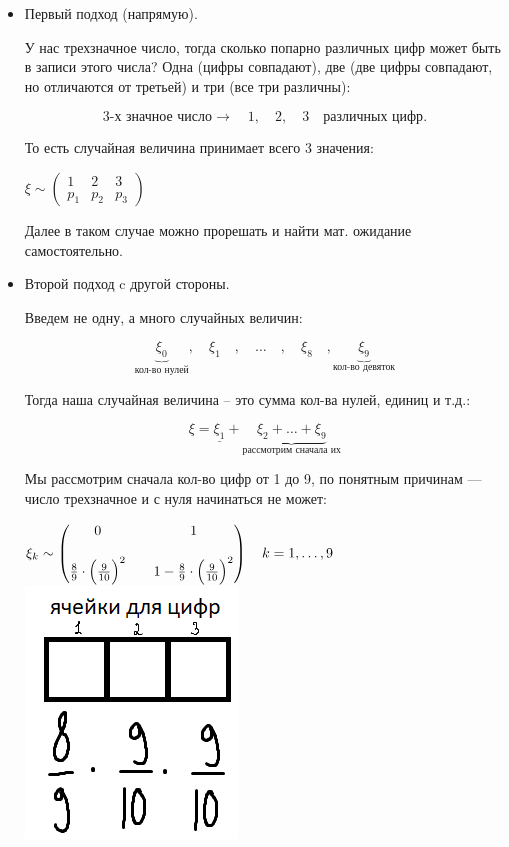 \documentclass{article}
\begin{document}
\begin{itemize}
\item Первый подход (напрямую).

У нас трехзначное число, тогда сколько попарно различных цифр может быть в записи этого числа? Одна (цифры совпадают), две (две цифры совпадают, но отличаются от третьей) и три (все три различны):

$$\text{3-х значное число}\rightarrow \quad 1,\quad 2,\quad 3 \quad \text{различных цифр}.$$

То есть случайная величина принимает всего 3 значения:

$\xi \sim
\begin{pmatrix}
1 & 2 & 3\\
p_1 & p_2 & p_3
\end{pmatrix}
$

Далее в таком случае можно прорешать и найти мат. ожидание самостоятельно.

\item Второй подход c другой стороны.

Введем не одну, а много случайных величин:

$$\underbrace{\xi_0}_{\text{кол-во нулей}},
\quad \xi_1 \quad,
\quad \ldots \quad ,
\quad \xi_8 \quad , 
\underbrace{\xi_9}_{\text{кол-во девяток}}$$

Тогда наша случайная величина -- это сумма кол-ва нулей, единиц и т.д.:

$$\xi = \underline{\xi_1} + \underbrace{\xi_2 + \ldots + \xi_9}_{\text{рассмотрим сначала их}}$$

Мы рассмотрим сначала кол-во цифр от 1 до 9, по понятным причинам --- число трехзначное и с нуля начинаться не может:

\begin{center}
	$\xi_k \sim
	\begin{pmatrix}
	0 & & 1\\
	& & \\
	\frac{8}{9} \cdot \Bigl(\frac{9}{10}\Bigr)^2 & &
	1 - \frac{8}{9} \cdot \Bigl(\frac{9}{10}\Bigr)^2
	\end{pmatrix}\quad
	k = 1, \ldots, 9\quad$
	\includegraphics[scale=0.3]{4.png}
\end{center}


\end{itemize}
\end{document}

